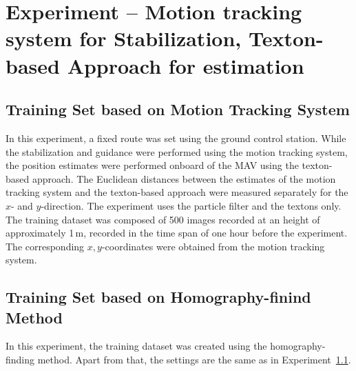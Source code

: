 \section{Experiment -- Motion tracking system for Stabilization, Texton-based Approach for estimation}

\subsection{Training Set based on Motion Tracking System}
\label{sec:experiment-real}

In this experiment, a fixed route was set using the ground control
station. While the stabilization and guidance were performed using
the motion tracking system, the position estimates were performed onboard
of the MAV using the texton-based approach. The Euclidean distances between the estimates of the motion tracking system and the texton-based approach
were measured separately for the $x$- and $y$-direction. The experiment uses the
particle filter and the textons only. The training dataset was composed of 500 images recorded at an height of approximately 1\,m, recorded in the time span of one hour before the experiment. The corresponding $x,y$-coordinates were obtained from the motion tracking system.  

\subsection{Training Set based on Homography-finind Method}
\label{sec:traininghomo}

In this experiment, the training dataset was created using the homography-finding method. Apart from that, the settings are the same as in Experiment~\ref{sec:experiment-real}.